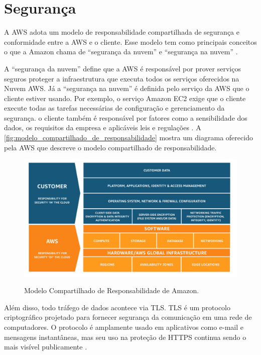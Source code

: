 \section{Segurança}\label{section:aws_iot_security}

A AWS adota um modelo de responsabilidade compartilhada de segurança e conformidade entre a AWS e o cliente. Esse modelo tem como principais conceitos o que a Amazon chama de ``segurança da nuvem'' e ``segurança na nuvem'' \cite{ref:012}.

A ``segurança da nuvem'' define que a AWS é responsável por prover serviços seguros proteger a infraestrutura que executa todos os serviços oferecidos na Nuvem AWS. Já a ``segurança na nuvem'' é definida pelo serviço da AWS que o cliente estiver usando. Por exemplo, o serviço Amazon EC2 exige que o cliente execute todas as tarefas necessárias de configuração e gerenciamento da segurança. o cliente também é responsável por fatores como a sensibilidade dos dados, os requisitos da empresa e aplicáveis leis e regulações \cite{ref:013}. A \autoref{fig:modelo_compartilhado_de_responsabilidade} mostra um diagrama oferecido pela AWS que descreve o modelo compartilhado de responsabilidade.

\begin{figure}[htbp]
    \centering
    \caption{Modelo Compartilhado de Responsabilidade de Amazon.}
    \includegraphics[scale=0.35]{Imagens/modelo_compartilhado_de_responsabilidade.jpg}
    \label{fig:modelo_compartilhado_de_responsabilidade}
\end{figure}

Além disso, todo tráfego de dados acontece via TLS. TLS é um protocolo criptográfico projetado para fornecer segurança da comunicação em uma rede de computadores. O protocolo é amplamente usado em aplicativos como e-mail e mensagens instantâneas, mas seu uso na proteção de HTTPS continua sendo o mais visível publicamente \cite{ref:014}.

